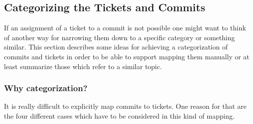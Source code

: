 \subsection{Categorizing the Tickets and Commits}

If an assignment of a ticket to a commit is not possible one might want to think of another way for narrowing them down to a specific category or something similar.
This section describes some ideas for achieving a categorization of commits and tickets in order to be able to support mapping them manually or at least summarize those which refer to a similar topic.

\subsubsection{Why categorization?}

It is really difficult to explicitly map commits to tickets.
One reason for that are the four different cases which have to be considered in this kind of mapping.\\

